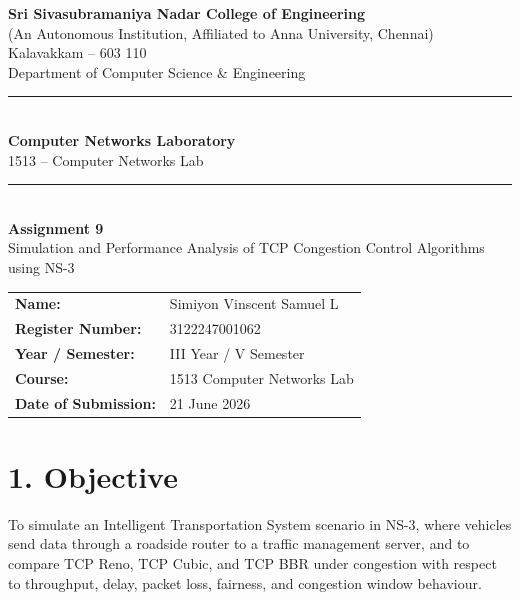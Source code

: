\documentclass[11pt]{article}
\title{\vspace{-2cm}}
\date{}
\begin{document}
\begin{titlepage}
\centering
\vspace*{1cm}
{\large \textbf{Sri Sivasubramaniya Nadar College of Engineering}}\\
{\small (An Autonomous Institution, Affiliated to Anna University, Chennai)}\\
{\small Kalavakkam -- 603 110}\\[0.3cm]
{\small Department of Computer Science \& Engineering}\\[1.5cm]

\rule{\linewidth}{0.5mm}\\[0.4cm]
{\LARGE \textbf{Computer Networks Laboratory}}\\[0.3cm]
{\Large 1513 -- Computer Networks Lab}\\[0.4cm]
\rule{\linewidth}{0.5mm}\\[1.5cm]

{\huge \textbf{Assignment 9}}\\[0.4cm]
{\Large Simulation and Performance Analysis of TCP Congestion Control Algorithms using NS-3}\\[2cm]

\begin{center}
\begin{tabular}{ll}
\textbf{Name:} & Simiyon Vinscent Samuel L \\[0.2cm]
\textbf{Register Number:} & 3122247001062 \\[0.2cm]
\textbf{Year / Semester:} & III Year / V Semester \\[0.2cm]
\textbf{Course:} & 1513 Computer Networks Lab \\[0.2cm]
\textbf{Date of Submission:} & 21 June 2026 \\[0.2cm]
\end{tabular}
\end{center}

\vfill
\end{titlepage}

\section*{1. Objective}
To simulate an Intelligent Transportation System scenario in NS-3, where
vehicles send data through a roadside router to a traffic management server,
and to compare TCP Reno, TCP Cubic, and TCP BBR under congestion with respect
to throughput, delay, packet loss, fairness, and congestion window behaviour.
\end{document}
